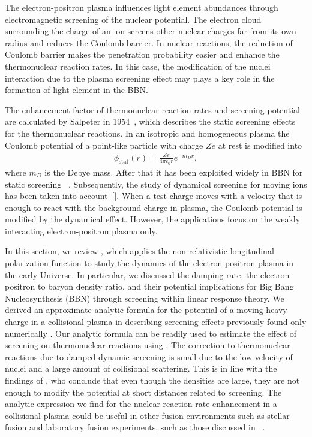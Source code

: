The electron-positron plasma influences light element abundances through electromagnetic screening of the nuclear potential. The electron cloud surrounding the charge of an ion screens other nuclear charges far from its own radius and reduces the Coulomb barrier. In nuclear reactions, the reduction of Coulomb barrier makes the penetration probability easier and enhance the thermonuclear reaction rates. In this case, the modification of the nuclei interaction due to the plasma screening effect may plays a key role in the formation of light element in the BBN. 

The enhancement factor of thermonuclear reaction rates and screening potential are calculated by Salpeter in 1954~\cite{Salpeter:1954nc}, which describes the static screening effects for the thermonuclear reactions. In an isotropic and homogeneous plasma the Coulomb potential of a point-like particle with charge $Ze$ at rest is modified into~\cite{Salpeter:1954nc}
\begin{align}
\phi_\text{stat}(r)=\frac{Ze}{4\pi\epsilon_0 r}e^{-m_Dr},
\end{align}
where $m_D$ is the Debye mass. After that it has been exploited widely in BBN for static screening ~\cite{1969ApJ...155..183S,Famiano:2016hhs}. Subsequently, the study of dynamical screening for moving ions has been taken into account~[\cite{1988ApJ...331..565C,Gruzinov:1997as,Hwang:2021kno}]. When a test charge moves with a velocity that is enough to react with the background charge in plasma, the Coulomb potential is modified by the dynamical effect. However, the applications focus on the weakly interacting electron-positron plasma only. 


In this section, we review \cite{Grayson:2023flr}, which applies the non-relativistic longitudinal polarization function to study the dynamics of the electron-positron plasma in the early Universe. In particular, we discussed the damping rate, the electron-positron to baryon density ratio, and their potential implications for Big Bang Nucleosynthesis (BBN) through screening within linear response theory. We derived an approximate analytic formula for the potential of a moving heavy charge in a collisional plasma in  describing screening effects previously found only numerically \cite{Hwang:2021kno}. Our analytic formula can be readily used to estimate the effect of screening on thermonuclear reactions using . The correction to thermonuclear reactions due to damped-dynamic screening is small due to the low velocity of nuclei and a large amount of collisional scattering. This is in line with the findings of \cite{Hwang:2021kno}, who conclude that even though the densities are large, they are not enough to modify the potential at short distances related to screening. The analytic expression we find for the nuclear reaction rate enhancement  in a collisional plasma could be useful in other fusion environments such as stellar fusion and laboratory fusion experiments, such as those discussed in ~\cite{Labaune:2013dla,Margarone:2022mdpi}.

